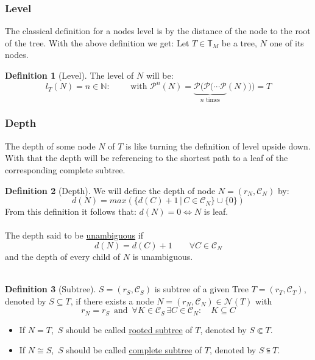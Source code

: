 \documentclass[a4paper,12pt]{article}
\theoremstyle{definition}
\newtheorem{definition}{Definition}[section]
\begin{document}
		\subsubsection{Level}
		The classical definition for  a nodes level is by the distance of the node to the root of the tree.
		With the above definition we get:
		Let $T\in\mathds{T}_M$ be a tree, $N$ one of its nodes.  
		\begin{definition}[Level]
			 The level of $N$ will be: \[l_T(N)=n\in \mathds{N}:\qquad\text{ with } \mathcal{P}^{n}(N)=\underbrace{\mathcal{P}(\mathcal{P}(\cdots \mathcal{P}}_{n\text{ times}}(N)))=T \]
		\end{definition}
		\subsubsection{Depth}
		The depth of some node $N$ of $T$ is like turning the definition of level upside down. With that the depth will be referencing to the shortest path to a leaf of the corresponding complete subtree.\\
	\begin{definition}[Depth]
			We will define the depth of node $N=(r_N,\mathcal{C}_N)$ by:
		\[d(N)= max\left(\{d(C)+1\,\vert\, C\in\mathcal{C}_N\} \cup \{0\}\right)\]
		From this definition it follows that: $d(N)=0 \Leftrightarrow N$ is leaf.\\\\
		The depth said to be \underline{unambiguous} if \[d(N)=d(C) + 1\qquad \forall C\in\mathcal{C}_N\] 
		and the depth of every child of $N$ is unambiguous.\\\\
	\end{definition}
		

			\begin{definition}[Subtree]
				$S=(r_S,\mathcal{C}_S)$ is subtree of a given Tree $T=(r_T,\mathcal{C}_T)$, denoted by $S\subseteq T$, if there exists a node $N=(r_N,\mathcal{C}_N)\in \mathcal{N}(T)$ with \[r_N=r_S\,\text{ and }\, \forall K\in \mathcal{C}_S\,\exists C\in  \mathcal{C}_N:\quad   K\subseteq C\]
				\begin{itemize}
					\item	If $N = T$, $\,S$ should be called \underline{rooted subtree} of $T$, denoted by $S\Subset T$.
					\item 	If $N \cong S$, $\,S$ should be called \underline{complete subtree}  of $T$, denoted by $S\subseteqq T$.\\
				\end{itemize}
			\end{definition}
			
\end{document}

